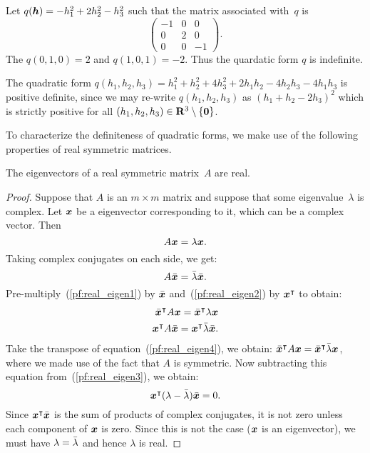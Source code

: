 \begin{example}
Let $q(\boldsymbol{h}) = -h_1^2 + 2h_2^2 - h_3^2$ such that the matrix associated with~$q$ is
\[
	\begin{pmatrix}
	-1 & 0 & 0 \\
	0  & 2 & 0 \\
    0  & 0 & -1 
	\end{pmatrix}.
\]
The $q(0, 1, 0) = 2$ and $q(1, 0, 1) = -2$. Thus the quardatic form $q$ is indefinite.
\end{example}    

\begin{example}
The quadratic form $q(h_1, h_2, h_3) = h_1^2 + h_2^2 + 4h_3^2 + 2h_1h_2 - 4h_2h_3 - 4h_1 h_3$
is positive definite, since we may re-write $q(h_1, h_2, h_3)$ as $(h_1 + h_2 - 2h_3)^2$
which is strictly positive for all $(h_1, h_2, h_3) \in \mathbf{R}^3 \setminus \{\boldsymbol{0}\}$.
\end{example}
To characterize the definiteness of quadratic forms, we make use of the following 
properties of real symmetric matrices.
\begin{lemma}
The eigenvectors of a real symmetric matrix~$A$ are real.
\end{lemma}
\begin{proof}
Suppose that $A$ is an $m \times m$ matrix and suppose that some eigenvalue~$\lambda$ 
is complex. Let $\boldsymbol{x}$ be a eigenvector corresponding to it, which can be a complex 
vector. Then 
\begin{equation}\label{pf:real_eigen1}
	A \boldsymbol{x} =  \lambda \boldsymbol{x}.
\end{equation}
Taking complex conjugates on each side, we get:
\begin{equation}\label{pf:real_eigen2}
	A \bar{\boldsymbol{x}} =  \bar{\lambda} \bar{\boldsymbol{x}}.
\end{equation}
Pre-multiply~(\ref{pf:real_eigen1})  by $\bar{\boldsymbol{x}}$ 
and~(\ref{pf:real_eigen2}) by $\boldsymbol{x}^{\intercal}$ 
to obtain:
\begin{eqnarray}
	\bar{\boldsymbol{x}}^{\intercal} A \boldsymbol{x} =  \bar{\boldsymbol{x}}^{\intercal} \lambda \boldsymbol{x} \label{pf:real_eigen3}\\
	\boldsymbol{x} ^{\intercal}A \bar{\boldsymbol{x}} =  \boldsymbol{x}^{\intercal} \bar{\lambda} \bar{\boldsymbol{x}} \label{pf:real_eigen4}.
\end{eqnarray}
Take the transpose of equation~(\ref{pf:real_eigen4}), we obtain: 
$\bar{\boldsymbol{x}}^{\intercal} A \boldsymbol{x} =  \bar{\boldsymbol{x}}^{\intercal} \bar{\lambda} \boldsymbol{x}$, 
where we made use of the fact that $A$ is symmetric. Now subtracting this equation from~(\ref{pf:real_eigen3}),
we obtain: 
\[
\boldsymbol{x}^{\intercal} (\lambda - \bar{\lambda}) \bar{\boldsymbol{x}} = 0.
\]
Since $\boldsymbol{x}^{\intercal} \bar{\boldsymbol{x}}$ is the sum of products of complex conjugates, 
it is not zero unless each component of $\boldsymbol{x}$ is zero. Since this is not the case 
($\boldsymbol{x}$ is an eigenvector), we must have $\lambda = \bar{\lambda}$ and hence $\lambda$
is real. 
\end{proof} 

